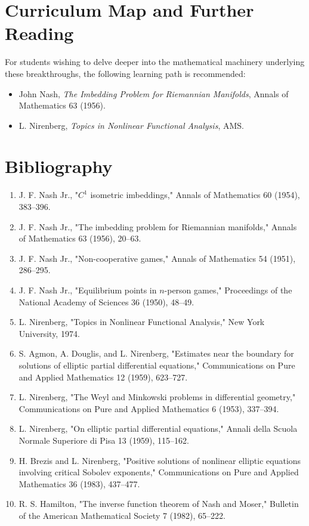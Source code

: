\section{Curriculum Map and Further Reading}
For students wishing to delve deeper into the mathematical machinery underlying these breakthroughs, the following learning path is recommended:
\begin{itemize}
  \item John Nash, \emph{The Imbedding Problem for Riemannian Manifolds}, Annals of Mathematics 63 (1956).
  \item L. Nirenberg, \emph{Topics in Nonlinear Functional Analysis}, AMS.
\end{itemize}

\section*{Bibliography}
\begin{enumerate}
\item J. F. Nash Jr., "$C^1$ isometric imbeddings," Annals of Mathematics 60 (1954), 383--396.
\item J. F. Nash Jr., "The imbedding problem for Riemannian manifolds," Annals of Mathematics 63 (1956), 20--63.
\item J. F. Nash Jr., "Non-cooperative games," Annals of Mathematics 54 (1951), 286--295.
\item J. F. Nash Jr., "Equilibrium points in $n$-person games," Proceedings of the National Academy of Sciences 36 (1950), 48--49.
\item L. Nirenberg, "Topics in Nonlinear Functional Analysis," New York University, 1974.
\item S. Agmon, A. Douglis, and L. Nirenberg, "Estimates near the boundary for solutions of elliptic partial differential equations," Communications on Pure and Applied Mathematics 12 (1959), 623--727.
\item L. Nirenberg, "The Weyl and Minkowski problems in differential geometry," Communications on Pure and Applied Mathematics 6 (1953), 337--394.
\item L. Nirenberg, "On elliptic partial differential equations," Annali della Scuola Normale Superiore di Pisa 13 (1959), 115--162.
\item H. Brezis and L. Nirenberg, "Positive solutions of nonlinear elliptic equations involving critical Sobolev exponents," Communications on Pure and Applied Mathematics 36 (1983), 437--477.
\item R. S. Hamilton, "The inverse function theorem of Nash and Moser," Bulletin of the American Mathematical Society 7 (1982), 65--222.
\end{enumerate}
